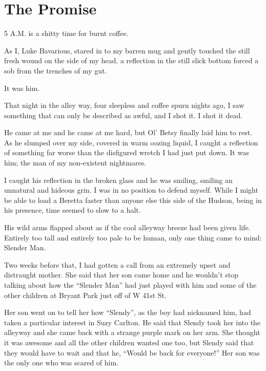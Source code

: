 \chapter{The Promise}


5 A.M. is a shitty time for burnt coffee.



As I, Luke Bavarious, stared in to my barren mug and gently touched
the still fresh wound on the side of my head, a reflection in the
still slick bottom forced a sob from the trenches of my gut.



It was him.



That night in the alley way, four sleepless and coffee spurn nights
ago, I saw something that can only be described as awful, and I
shot it. I shot it dead.



He came at me and he came at me hard, but Ol' Betsy finally
laid him to rest. As he slumped over my side, covered in warm
oozing liquid, I caught a reflection of something far worse than
the disfigured wretch I had just put down. It was him; the man of
my non-existent nightmares.



I caught his reflection in the broken glass and he was smiling,
smiling an unnatural and hideous grin. I was in no position to
defend myself. While I might be able to load a Beretta faster than
anyone else this side of the Hudson, being in his presence, time
seemed to slow to a halt.



His wild arms flapped about as if the cool alleyway breeze had been
given life. Entirely too tall and entirely too pale to be human,
only one thing came to mind: Slender Man.



Two weeks before that, I had gotten a call from an extremely upset
and distraught mother. She said that her son came home and he
wouldn't stop talking about how the ``Slender Man''
had just played with him and some of the other children at Bryant
Park just off of W 41st St.



Her son went on to tell her how ``Slendy'', as the boy
had nicknamed him, had taken a particular interest in Suzy Carlton.
He said that Slendy took her into the alleyway and she came back
with a strange purple mark on her arm. She thought it was awesome
and all the other children wanted one too, but Slendy said that
they would have to wait and that he, ``Would be back for
everyone!'' Her son was the only one who was scared of
him.



